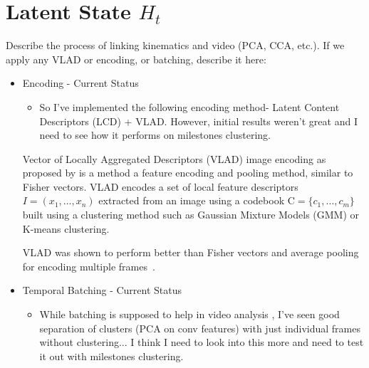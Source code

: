 \section{Latent State $H_t$}
Describe the process of linking kinematics and video (PCA, CCA, etc.).
If we apply any VLAD or encoding, or batching, describe it here:

\begin{itemize}
\item Encoding - Current Status
\begin{itemize}
\item So I've implemented the following encoding method- Latent Content Descriptors (LCD) + VLAD. However, initial results weren't great and I need to see how it performs on milestones clustering.
\end{itemize}


Vector of Locally Aggregated Descriptors (VLAD) image encoding as proposed by \cite{jegou2010aggregating} is a method a feature encoding and pooling method, similar to Fisher vectors. VLAD encodes a set of local feature descriptors $I=(x_1,\ldots,x_n)$ extracted from an image using a codebook $\mathrm{C} = \{c_1, \ldots, c_m \}$ built using a clustering method such as Gaussian Mixture Models (GMM) or K-means clustering.


VLAD was shown to perform better than Fisher vectors and average pooling for encoding multiple frames~\cite{xu2014discriminative}.

\item Temporal Batching - Current Status
\begin{itemize}
\item While batching is supposed to help in video analysis , I've seen good separation of clusters (PCA on conv features) with just individual frames without clustering... I think I need to look into this more and need to test it out with milestones clustering.
\end{itemize}

\end{itemize}



